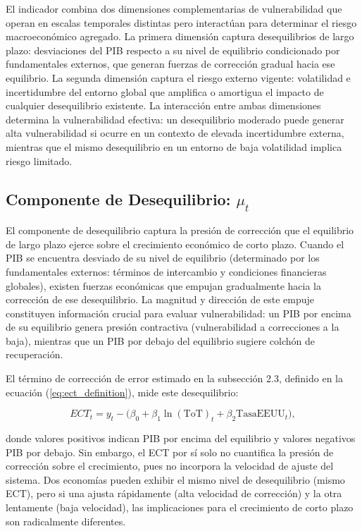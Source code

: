 \documentclass[3p,11pt,draft,natbib=false]{elsarticle}
\begin{document}
El indicador combina dos dimensiones complementarias de vulnerabilidad que operan en escalas temporales distintas pero interactúan para determinar el riesgo macroeconómico agregado. La primera dimensión captura desequilibrios de largo plazo: desviaciones del PIB respecto a su nivel de equilibrio condicionado por fundamentales externos, que generan fuerzas de corrección gradual hacia ese equilibrio. La segunda dimensión captura el riesgo externo vigente: volatilidad e incertidumbre del entorno global que amplifica o amortigua el impacto de cualquier desequilibrio existente. La interacción entre ambas dimensiones determina la vulnerabilidad efectiva: un desequilibrio moderado puede generar alta vulnerabilidad si ocurre en un contexto de elevada incertidumbre externa, mientras que el mismo desequilibrio en un entorno de baja volatilidad implica riesgo limitado.

\subsection{Componente de Desequilibrio: \texorpdfstring{$\mu_t$}{mu\_t}}
\label{sec:mu}

El componente de desequilibrio captura la presión de corrección que el equilibrio de largo plazo ejerce sobre el crecimiento económico de corto plazo. Cuando el PIB se encuentra desviado de su nivel de equilibrio (determinado por los fundamentales externos: términos de intercambio y condiciones financieras globales), existen fuerzas económicas que empujan gradualmente hacia la corrección de ese desequilibrio. La magnitud y dirección de este empuje constituyen información crucial para evaluar vulnerabilidad: un PIB por encima de su equilibrio genera presión contractiva (vulnerabilidad a correcciones a la baja), mientras que un PIB por debajo del equilibrio sugiere colchón de recuperación.

El término de corrección de error estimado en la subsección 2.3, definido en la ecuación (\ref{eq:ect_definition}), mide este desequilibrio:

\begin{equation}
ECT_{t} = y_t - \Big( \beta_0 + \beta_1 \ln(\text{ToT})_t + \beta_2 \text{TasaEEUU}_t \Big),
\end{equation}

donde valores positivos indican PIB por encima del equilibrio y valores negativos PIB por debajo. Sin embargo, el ECT por sí solo no cuantifica la presión de corrección sobre el crecimiento, pues no incorpora la velocidad de ajuste del sistema. Dos economías pueden exhibir el mismo nivel de desequilibrio (mismo ECT), pero si una ajusta rápidamente (alta velocidad de corrección) y la otra lentamente (baja velocidad), las implicaciones para el crecimiento de corto plazo son radicalmente diferentes.
\end{document}
